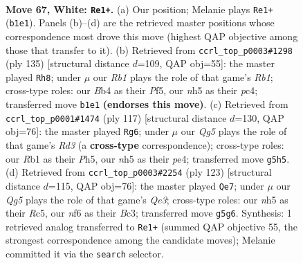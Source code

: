 \documentclass[11pt]{article}
\begin{document}
\clearpage

\begin{figure}[p]\centering
\begin{subfigure}{0.46\textwidth}\centering
\resizebox{\linewidth}{!}{%
\newchessgame
\chessboard[
  setfen={3qk3/3b1p2/5n2/6Qn/1Bp4P/p4pP1/P6K/1R6 w - - 2 67},
  showmover=false,
  pgfstyle=straightmove, color=movearrow, markmove={b1-e1}
]}
\caption{}
\end{subfigure}\hfill
\begin{subfigure}{0.46\textwidth}\centering
\resizebox{\linewidth}{!}{%
\newchessgame
\chessboard[
  setfen={1r6/3k4/3p3P/P1p1qp2/2P2N2/6QK/6P1/8 b - - 2 68},
  showmover=false,
  pgfstyle=straightmove, color=movearrow, markmove={b8-h8}
]}
\caption{}
\end{subfigure}
\\[4pt]
\begin{subfigure}{0.46\textwidth}\centering
\resizebox{\linewidth}{!}{%
\newchessgame
\chessboard[
  setfen={6k1/6p1/3r4/1p2q2p/1P1NP3/p1BK3Q/P7/8 b - - 3 59},
  showmover=false,
  pgfstyle=straightmove, color=movearrow, markmove={d6-g6}
]}
\caption{}
\end{subfigure}\hfill
\begin{subfigure}{0.46\textwidth}\centering
\resizebox{\linewidth}{!}{%
\newchessgame
\chessboard[
  setfen={8/5pk1/4q1p1/2r1N2p/B6P/2b1QPB1/6PK/8 b - - 2 62},
  showmover=false,
  pgfstyle=straightmove, color=movearrow, markmove={e6-e7}
]}
\caption{}
\end{subfigure}
\caption{\textbf{Move 67, White: \texttt{Re1+}.} (a) Our position; Melanie plays \texttt{Re1+} (\texttt{b1e1}). Panels (b)--(d) are the retrieved master positions whose correspondence most drove this move (highest QAP objective among those that transfer to it). (b) Retrieved from \texttt{ccrl\_top\_p0003\#1298} (ply 135) [structural distance $d$=109, QAP obj=55]: the master played \texttt{Rh8}; under $\mu$ our \emph{Rb1} plays the role of that game's \emph{Rb1}; cross-type roles: our \emph{B}b4 as their \emph{P}f5, our \emph{n}h5 as their \emph{p}c4; transferred move \texttt{b1e1} \textbf{(endorses this move)}. (c) Retrieved from \texttt{ccrl\_top\_p0001\#1474} (ply 117) [structural distance $d$=130, QAP obj=76]: the master played \texttt{Rg6}; under $\mu$ our \emph{Qg5} plays the role of that game's \emph{Rd3} (a \textbf{cross-type} correspondence); cross-type roles: our \emph{R}b1 as their \emph{P}h5, our \emph{n}h5 as their \emph{p}e4; transferred move \texttt{g5h5}. (d) Retrieved from \texttt{ccrl\_top\_p0003\#2254} (ply 123) [structural distance $d$=115, QAP obj=76]: the master played \texttt{Qe7}; under $\mu$ our \emph{Qg5} plays the role of that game's \emph{Qe3}; cross-type roles: our \emph{n}h5 as their \emph{R}c5, our \emph{n}f6 as their \emph{B}c3; transferred move \texttt{g5g6}. Synthesis: 1 retrieved analog transferred to \texttt{Re1+} (summed QAP objective 55, the strongest correspondence among the candidate moves); Melanie committed it via the \texttt{search} selector.}
\label{fig:thought-m132}
\end{figure}
\end{document}
